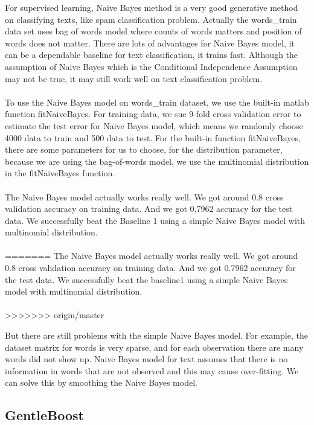 \documentclass[]{article}
\begin{document}
For supervised learning, Naive Bayes method is a very good generative method on classifying texts, like spam classification problem. Actually the words\_train data set uses bag of words model where counts of words matters and position of words does not matter. There are lots of advantages for Naive Bayes model, it can be a dependable baseline for text classification, it trains fast. Although the assumption of Naive Bayes which is the Conditional Independence Assumption may not be true, it may still work well on text classification problem.\\\\

To use the Naive Bayes model on words\_train dataset, we use the built-in matlab function fitNaiveBayes. For training data, we sue 9-fold cross validation error to estimate the test error for Naive Bayes model, which means we randomly choose 4000 data to train and 500 data to test. For the built-in function fitNaiveBayes, there are some parameters for us to choose, for the distribution parameter, because we are using the bag-of-words model, we use the multinomial distribution in the fitNaiveBayes function. \\\\


The Naive Bayes model actually works really well. We got around 0.8 cross validation accuracy on training data. And we got 0.7962 accuracy for the test data. We successfully beat the Baseline 1 using a simple Naive Bayes model with multinomial distribution. \\\\
=======
The Naive Bayes model actually works really well. We got around 0.8 cross validation accuracy on training data. And we got 0.7962 accuracy for the test data. We successfully beat the baseline1 using a simple Naive Bayes model with multinomial distribution. \\\\
>>>>>>> origin/master

But there are still problems with the simple Naive Bayes model. For example, the dataset matrix for words is very sparse, and for each observation there are many  words did not show up. Naive Bayes model for text assumes that there is no information in words that are not observed and this may cause over-fitting. We can solve this by smoothing the Naive Bayes model.

\subsection{GentleBoost}
\end{document}
